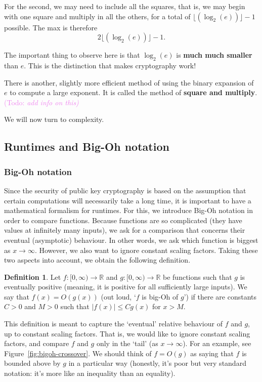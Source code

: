 \documentclass{article}
\theoremstyle{plain}
\theoremstyle{definition}
\newtheorem{definition}[theorem]{Definition}
\theoremstyle{remark}
\numberwithin{theorem}{section}
\newcommand{\KS}[1]{\textcolor{violet}{{\sf (Todo:} {\sl{#1})}}}
\newcommand{\KS}[1]{}
\newcommand{\RR}{\mathbb{R}}
\begin{document}
For the second, we may need to include all the squares, that is, we may begin with one square and multiply in all the others, for a total of $\lfloor(\log_2(e))\rfloor - 1$ possible.  The max is therefore
\[
2\lfloor(\log_2(e))\rfloor - 1.
\]

The important thing to observe here is that $\log_2(e)$ is \textbf{much much smaller} than $e$.  This is the distinction that makes cryptography work!  

There is another, slightly more efficient method of using the binary expansion of $e$ to compute a large exponent.  It is called the method of \textbf{square and multiply}. \KS{add info on this}

We will now turn to complexity.



\subsection{Runtimes and Big-Oh notation}

\subsubsection{Big-Oh notation}

Since the security of public key cryptography is based on the assumption that certain computations will necessarily take a long time, it is important to have a mathematical formalism for runtimes.  For this, we introduce Big-Oh notation in order to compare functions.  Because functions are so complicated (they have values at infinitely many inputs), we ask for a comparison that concerns their eventual (asymptotic) behaviour.  In other words, we ask which function is biggest as $x \rightarrow \infty$.  However, we also want to ignore constant scaling factors.  Taking these two aspects into account, we obtain the following definition.

\begin{definition}
	Let $f: [0,\infty) \rightarrow \RR$ and $g:[0,\infty) \rightarrow \RR$ be functions such that $g$ is eventually positive (meaning, it is positive for all sufficiently large inputs).  We say that $f(x) = O(g(x))$ (out loud, `$f$ is big-Oh of $g$') if there are constants $C > 0$ and $M > 0$ such that $|f(x)| \le C g(x)$ for $x > M$.
\end{definition}

This definition is meant to capture the `eventual' relative behaviour of $f$ and $g$, up to constant scaling factors.  That is, we would like to ignore constant scaling factors, and compare $f$ and $g$ only in the `tail' (as $x \rightarrow \infty$).  For an example, see Figure~\ref{fig:bigoh-crossover}.  We should think of $f = O(g)$ as saying that $f$ is bounded above by $g$ in a particular way (honestly, it's poor but very standard notation:  it's more like an inequality than an equality).
\end{document}
